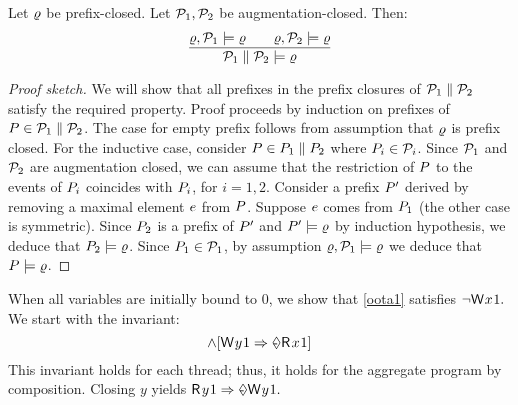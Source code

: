 \begin{proposition}%
  Let $\varrho$ be prefix-closed.  Let $\mathcal{P}_1, \mathcal{P}_2$ be
  augmentation\hyp{}closed.%
  Then:
  \begin{displaymath}
    \frac{
      \varrho, \mathcal{P}_1 \models\varrho
      \qquad
      \varrho, \mathcal{P}_2 \models\varrho
    }{\mathcal{P}_1 \parallel \mathcal{P}_2 \models \varrho}
  \end{displaymath}
\end{proposition}
\begin{proof}[Proof sketch]
  We will show that all prefixes in the prefix closures of
  $\mathcal{P}_1 \parallel \mathcal{P}_2$ satisfy the required property.  Proof proceeds
  by induction on prefixes of $P \in \mathcal{P}_1 \parallel \mathcal{P}_2$.
  The case for empty prefix  follows from assumption that  $\varrho$ is prefix closed.  
  For the inductive case, consider %
  $P \in P_1 \parallel P_2$ where
  $P_i \in \mathcal{P}_i$.  Since $\mathcal{P}_1$ and $\mathcal{P}_2$ are augmentation
  closed, we can assume that the restriction of $P$ to the events of
  $P_i$ coincides with $P_i$, for $i=1,2$.
  Consider a prefix $P'$ derived by removing a maximal element $e$ from
  $P$.  Suppose $e$ comes from $P_1$ (the other case is
  symmetric). Since $P_2$ is a prefix of $P'$ and $P' \models \varrho$
  by induction hypothesis, we deduce that $P_2 \models \varrho$.
  Since $P_1 \in \mathcal{P}_1$, by assumption $\varrho, \mathcal{P}_1 \models\varrho$ we
  deduce that $P \models \varrho$.
\end{proof}
When all variables are initially bound to $0$, we show that \eqref{oota1}
satisfies
\begin{math}
  \lnot\DW{x}{1}.
\end{math}
 We start with the invariant:
\begin{displaymath}
  [\DW{x}{1}\Rightarrow\once\DR{y}{1}]
  \land
  [\DW{y}{1}\Rightarrow\once\DR{x}{1}]
\end{displaymath}
This invariant holds for each thread; thus, it holds for the
aggregate program by composition.  Closing $y$ yields
\begin{math}
  \DR{y}{1} \Rightarrow \once\DW{y}{1}.
\end{math}
